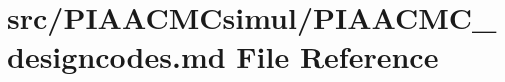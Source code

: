 \hypertarget{src_2PIAACMCsimul_2PIAACMC__designcodes_8md}{\section{src/\+P\+I\+A\+A\+C\+M\+Csimul/\+P\+I\+A\+A\+C\+M\+C\+\_\+designcodes.md File Reference}
\label{src_2PIAACMCsimul_2PIAACMC__designcodes_8md}
}
